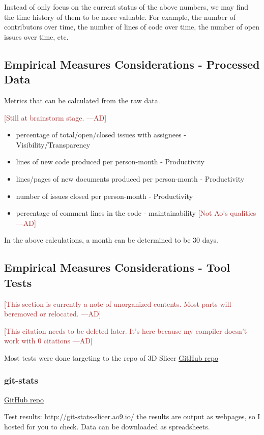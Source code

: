 \documentclass[letterpaper,cleveref]{lipics-v2019}
\newcommand{\authornote}[3]{\textcolor{#1}{[#3 ---#2]}}
\newcommand{\authornote}[3]{}
\newcommand{\ad}[1]{\authornote{brown}{AD}{#1}} %
\theoremstyle{definition}
\begin{document}
Instead of only focus on the current status of the above numbers, we may find
the time history of them to be more valuable. For example, the number of
contributors over time, the number of lines of code over time, the number of
open issues over time, etc.

\subsection{Empirical Measures Considerations - Processed Data}
Metrics that can be calculated from the raw data.

\ad{Still at brainstorm stage.}
\begin{itemize}
	\item percentage of total/open/closed issues with assignees -
	Visibility/Transparency
	\item lines of new code produced per person-month - Productivity
	\item lines/pages of new documents produced per person-month - Productivity
	\item number of issues closed per person-month - Productivity
	\item percentage of comment lines in the code - maintainability \ad{Not Ao's
		qualities}
\end{itemize}

In the above calculations, a month can be determined to be 30 days.

\subsection{Empirical Measures Considerations - Tool Tests}
\ad{This section is currently a note of unorganized contents. Most parts will beremoved or relocated.}

\ad{This citation needs to be deleted later. It's here because my compiler
	doesn't work with 0 citations}
\cite{Emms2019}

Most tests were done targeting to the repo of 3D Slicer
\href{https://github.com/tomgi/git_stats}{GitHub repo}

\subsubsection{git-stats}
\href{https://github.com/tomgi/git_stats}{GitHub repo}

Test results:
\href{http://git-stats-slicer.ao9.io/}{http://git-stats-slicer.ao9.io/} the
results are output as webpages, so I hosted for you to check. Data can be
downloaded as spreadsheets.
\end{document}
